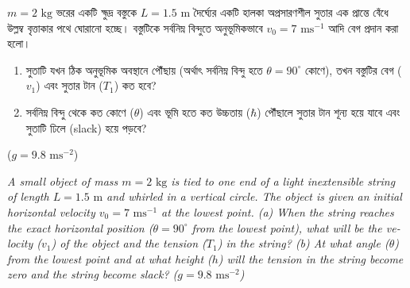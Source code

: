 \documentclass[12pt, a4paper]{article}
\begin{document}
\begin{tcolorbox}[questionbox={প্রশ্ন (Question) 10}]
\noindent
$m = 2\text{ kg}$ ভরের একটি ক্ষুদ্র বস্তুকে $L = 1.5\text{ m}$ দৈর্ঘ্যের একটি হালকা অপ্রসারণশীল সুতার এক প্রান্তে বেঁধে উল্লম্ব বৃত্তাকার পথে ঘোরানো হচ্ছে। বস্তুটিকে সর্বনিম্ন বিন্দুতে অনুভূমিকভাবে $v_0 = 7\text{ ms}^{-1}$ আদি বেগ প্রদান করা হলো। 
\begin{enumerate}
    \item[(ক)] সুতাটি যখন ঠিক অনুভূমিক অবস্থানে পৌঁছায় (অর্থাৎ সর্বনিম্ন বিন্দু হতে $\theta = 90^\circ$ কোণে), তখন বস্তুটির বেগ ($v_1$) এবং সুতার টান ($T_1$) কত হবে?
    \item[(খ)] সর্বনিম্ন বিন্দু থেকে কত কোণে ($\theta$) এবং ভূমি হতে কত উচ্চতায় ($\hbar$) পৌঁছালে সুতার টান শূন্য হয়ে যাবে এবং সুতাটি ঢিলে (slack) হয়ে পড়বে?
\end{enumerate}
($g = 9.8\text{ ms}^{-2}$)

\vspace{0.8em}
\begin{english}
\noindent\textit{\color{darkgray}
A small object of mass $m = 2\text{ kg}$ is tied to one end of a light inextensible string of length $L = 1.5\text{ m}$ and whirled in a vertical circle. The object is given an initial horizontal velocity $v_0 = 7\text{ ms}^{-1}$ at the lowest point. 
(a) When the string reaches the exact horizontal position ($\theta = 90^\circ$ from the lowest point), what will be the velocity ($v_1$) of the object and the tension ($T_1$) in the string? 
(b) At what angle ($\theta$) from the lowest point and at what height ($h$) will the tension in the string become zero and the string become slack? ($g = 9.8\text{ ms}^{-2}$)
}
\end{english}
\end{tcolorbox}
\end{document}
